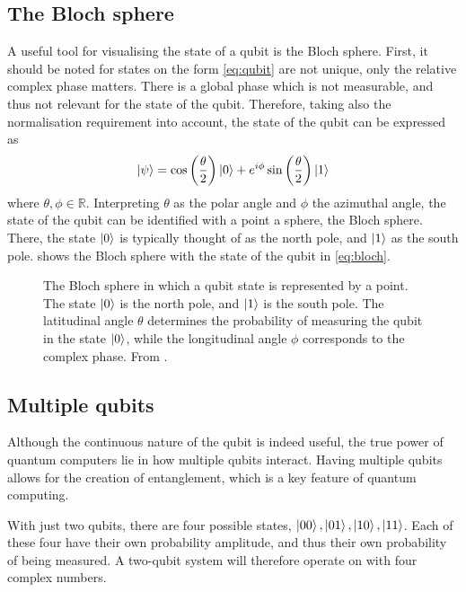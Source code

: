 \subsection{The Bloch sphere}
A useful tool for visualising the state of a qubit is the Bloch sphere.
First, it should be noted for states on the form \cref{eq:qubit} are not unique, only the relative complex phase matters.
There is a global phase which is not measurable, and thus not relevant for the state of the qubit.
Therefore, taking also the normalisation requirement into account, the state of the qubit can be expressed as
\begin{equation}
  \ket{\psi} = \cos\left(\frac{\theta}{2}\right) \ket{0} + e^{i\phi} \sin\left(\frac{\theta}{2}\right) \ket{1}
  \label{eq:bloch}
\end{equation}
where $\theta, \phi \in \mathbb{R}$.
Interpreting $\theta$ as the polar angle and $\phi$ the azimuthal angle, the state of the qubit can be identified with a point a sphere, the Bloch sphere.
There, the state $\ket{0}$ is typically thought of as the north pole, and $\ket{1}$ as the south pole.
 shows the Bloch sphere with the state of the qubit in \cref{eq:bloch}.

\begin{figure}
  \centering
  \def\svgwidth{0.4\textwidth}
  
  \caption{
    The Bloch sphere in which a qubit state is represented by a point.
    The state $\ket{0}$ is the north pole, and $\ket{1}$ is the south pole.
    The latitudinal angle $\theta$ determines the probability of measuring the qubit in the state $\ket{0}$, while the longitudinal angle $\phi$ corresponds to the complex phase.
    From \cite{wikipedia_bloch}.
  }
  \label{fig:bloch}
\end{figure}

\subsection{Multiple qubits}
Although the continuous nature of the qubit is indeed useful, the true power of quantum computers lie in how multiple qubits interact.
Having multiple qubits allows for the creation of entanglement, which is a key feature of quantum computing.

With just two qubits, there are four possible states, $\ket{00}, \ket{01}, \ket{10}, \ket{11}$.
Each of these four have their own probability amplitude, and thus their own probability of being measured.
A two-qubit system will therefore operate on with four complex numbers.


